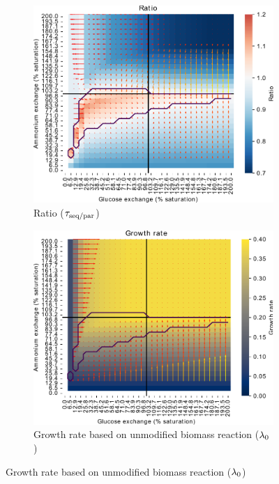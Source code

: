 \begin{figure}
  \centering
  \begin{subfigure}[t]{0.45\textwidth}
  \centering
    \includegraphics[width=\linewidth]{ec_grid_glc_amm_ratio}
    \caption{
      Ratio ($\tau_{\mathrm{seq}/\mathrm{par}}$)
    }
    \label{fig:model-grid-glc-ratio}
  \end{subfigure}%
  \begin{subfigure}[t]{0.45\textwidth}
  \centering
    \includegraphics[width=\linewidth]{ec_grid_glc_amm_gr}
    \caption{
      Growth rate based on unmodified biomass reaction ($\lambda_{0}$)
    }
    \label{fig:model-grid-glc-growthrate}
  \end{subfigure}


\end{figure}
